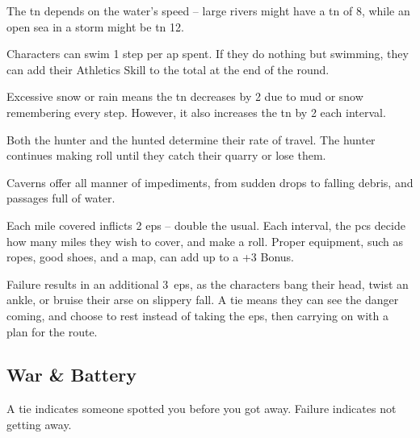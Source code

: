 \begin{multicols}{2}

The \gls{tn} depends on the water's speed -- large rivers might have a \gls{tn} of 8, while an open sea in a storm might be \gls{tn} 12.

Characters can swim 1 \gls{step} per \gls{ap} spent.
If they do nothing but swimming, they can add their Athletics Skill to the total at the end of the round.

Excessive snow or rain means the \gls{tn} decreases by 2 due to mud or snow remembering every step.
However, it also increases the \gls{tn} by 2 each \gls{interval}.

Both the hunter and the hunted determine their rate of travel.
The hunter continues making roll until they catch their quarry or lose them.

Caverns offer all manner of impediments, from sudden drops to falling debris, and passages full of water.

\caveTravelChart
Each mile covered inflicts 2 \glspl{ep} -- double the usual.
Each \gls{interval}, the \glspl{pc} decide how many miles they wish to cover, and make a roll.
Proper equipment, such as ropes, good shoes, and a map, can add up to a +3 Bonus.

Failure results in an additional 3~\glspl{ep}, as the characters bang their head, twist an ankle, or bruise their arse on slippery fall.
A tie means they can see the danger coming, and choose to rest instead of taking the \glspl{ep}, then carrying on with a plan for the route.

\subsection{War \& Battery}



A tie indicates someone spotted you before you got away.
Failure indicates not getting away.

\end{multicols}


